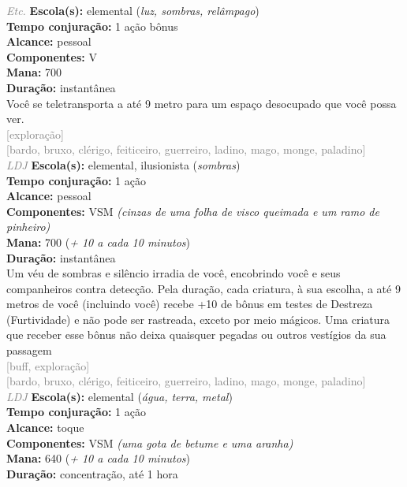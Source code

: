 \documentclass{RPG_Adventure}[2021/10/20]
\begin{document}
{\tiny \textcolor{gray}{\textit{Etc.}}}
{\small \t \textbf{Escola(s):} elemental (\textit{luz, sombras, relâmpago})\\\t \textbf{Tempo conjuração:} 1 ação bônus\\\t \textbf{Alcance:} pessoal\\\t \textbf{Componentes:} V\\\t \textbf{Mana:} 700\\\t \textbf{Duração:} instantânea\\}
{\normalsize Você se teletransporta a até 9 metro para um espaço desocupado que você possa ver.\\}
{\scriptsize \textcolor{gray}{[exploração]\\}}
{\scriptsize \textcolor{gray}{[bardo, bruxo, clérigo, feiticeiro, guerreiro, ladino, mago, monge, paladino]\\}}
{\tiny \textcolor{gray}{\textit{LDJ}}}
{\small \t \textbf{Escola(s):} elemental, ilusionista (\textit{sombras})\\\t \textbf{Tempo conjuração:} 1 ação\\\t \textbf{Alcance:} pessoal\\\t \textbf{Componentes:} VSM \textit{(cinzas de uma folha de visco queimada e um ramo de pinheiro)}\\\t \textbf{Mana:} 700 (\textit{+ 10 a cada 10 minutos})\\\t \textbf{Duração:} instantânea\\}
{\normalsize Um véu de sombras e silêncio irradia de você, encobrindo você e seus companheiros contra detecção. Pela duração, cada criatura, à sua escolha, a até 9 metros de você (incluindo você) recebe +10 de bônus em testes de Destreza (Furtividade) e não pode ser rastreada, exceto por meio mágicos. Uma criatura que receber esse bônus não deixa quaisquer pegadas ou outros vestígios da sua passagem\\}
{\scriptsize \textcolor{gray}{[buff, exploração]\\}}
{\scriptsize \textcolor{gray}{[bardo, bruxo, clérigo, feiticeiro, guerreiro, ladino, mago, monge, paladino]\\}}
{\tiny \textcolor{gray}{\textit{LDJ}}}
{\small \t \textbf{Escola(s):} elemental (\textit{água, terra, metal})\\\t \textbf{Tempo conjuração:} 1 ação\\\t \textbf{Alcance:} toque\\\t \textbf{Componentes:} VSM \textit{(uma gota de betume e uma aranha)}\\\t \textbf{Mana:} 640 (\textit{+ 10 a cada 10 minutos})\\\t \textbf{Duração:} concentração, até 1 hora\\}
\end{document}
